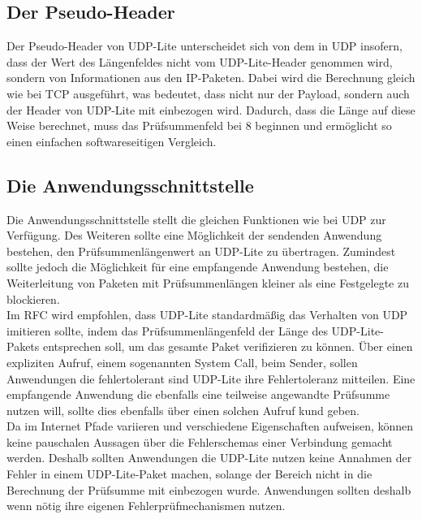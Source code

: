 \documentclass{template}
\begin{document}
\subsection{Der Pseudo-Header}

Der Pseudo-Header von UDP-Lite unterscheidet sich von dem in UDP
insofern, dass der Wert des Längenfeldes nicht vom UDP-Lite-Header genommen wird,
sondern von Informationen aus den IP-Paketen. Dabei wird die
Berechnung gleich wie bei TCP ausgeführt, was bedeutet, dass
nicht nur der Payload, sondern auch der Header von UDP-Lite mit
einbezogen wird. Dadurch, dass die Länge auf diese Weise berechnet,
muss das Prüfsummenfeld bei 8 beginnen und ermöglicht so einen
einfachen softwareseitigen Vergleich.\\


\subsection{Die Anwendungsschnittstelle}

Die Anwendungsschnittstelle stellt die gleichen Funktionen wie
bei UDP zur Verfügung. Des Weiteren sollte eine Möglichkeit der
sendenden Anwendung bestehen, den Prüfsummenlängenwert an UDP-Lite
zu übertragen. Zumindest sollte jedoch die Möglichkeit für eine
empfangende Anwendung bestehen, die Weiterleitung von Paketen mit
Prüfsummenlängen kleiner als eine Festgelegte zu blockieren.\\

Im RFC wird empfohlen, dass UDP-Lite standardmäßig das Verhalten
von UDP imitieren sollte, indem das Prüfsummenlängenfeld der
Länge des UDP-Lite-Pakets entsprechen soll, um das gesamte Paket
verifizieren zu können. Über einen expliziten Aufruf, einem
sogenannten System Call, beim Sender, sollen Anwendungen die 
fehlertolerant sind UDP-Lite ihre Fehlertoleranz
mitteilen. Eine empfangende Anwendung die ebenfalls eine teilweise
angewandte Prüfsumme nutzen will, sollte dies ebenfalls über
einen solchen Aufruf kund geben.\\

Da im Internet Pfade variieren und verschiedene Eigenschaften aufweisen,
können keine pauschalen Aussagen über die Fehlerschemas einer
Verbindung gemacht werden. Deshalb sollten Anwendungen die UDP-Lite
nutzen keine Annahmen der Fehler in einem UDP-Lite-Paket machen,
solange der Bereich nicht in die Berechnung der Prüfsumme
mit einbezogen wurde. Anwendungen sollten deshalb wenn nötig
ihre eigenen Fehlerprüfmechanismen nutzen.\\
\end{document}
